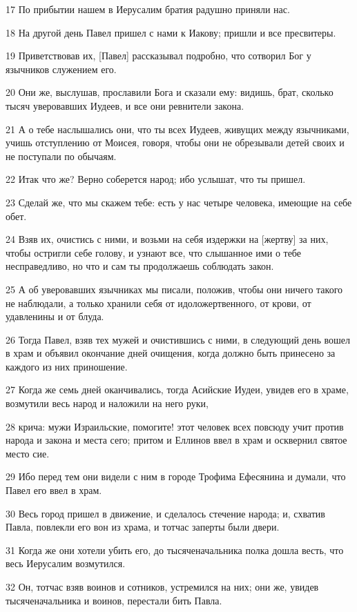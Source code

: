 \par 17 По прибытии нашем в Иерусалим братия радушно приняли нас.
\par 18 На другой день Павел пришел с нами к Иакову; пришли и все пресвитеры.
\par 19 Приветствовав их, [Павел] рассказывал подробно, что сотворил Бог у язычников служением его.
\par 20 Они же, выслушав, прославили Бога и сказали ему: видишь, брат, сколько тысяч уверовавших Иудеев, и все они ревнители закона.
\par 21 А о тебе наслышались они, что ты всех Иудеев, живущих между язычниками, учишь отступлению от Моисея, говоря, чтобы они не обрезывали детей своих и не поступали по обычаям.
\par 22 Итак что же? Верно соберется народ; ибо услышат, что ты пришел.
\par 23 Сделай же, что мы скажем тебе: есть у нас четыре человека, имеющие на себе обет.
\par 24 Взяв их, очистись с ними, и возьми на себя издержки на [жертву] за них, чтобы остригли себе голову, и узнают все, что слышанное ими о тебе несправедливо, но что и сам ты продолжаешь соблюдать закон.
\par 25 А об уверовавших язычниках мы писали, положив, чтобы они ничего такого не наблюдали, а только хранили себя от идоложертвенного, от крови, от удавленины и от блуда.
\par 26 Тогда Павел, взяв тех мужей и очистившись с ними, в следующий день вошел в храм и объявил окончание дней очищения, когда должно быть принесено за каждого из них приношение.
\par 27 Когда же семь дней оканчивались, тогда Асийские Иудеи, увидев его в храме, возмутили весь народ и наложили на него руки,
\par 28 крича: мужи Израильские, помогите! этот человек всех повсюду учит против народа и закона и места сего; притом и Еллинов ввел в храм и осквернил святое место сие.
\par 29 Ибо перед тем они видели с ним в городе Трофима Ефесянина и думали, что Павел его ввел в храм.
\par 30 Весь город пришел в движение, и сделалось стечение народа; и, схватив Павла, повлекли его вон из храма, и тотчас заперты были двери.
\par 31 Когда же они хотели убить его, до тысяченачальника полка дошла весть, что весь Иерусалим возмутился.
\par 32 Он, тотчас взяв воинов и сотников, устремился на них; они же, увидев тысяченачальника и воинов, перестали бить Павла.
